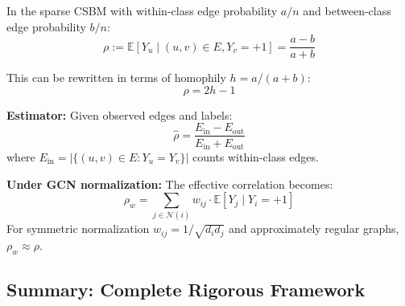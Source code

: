 \begin{definition}
\label{def:rho_explicit}
In the sparse CSBM with within-class edge probability $a/n$ and between-class edge probability $b/n$:
\begin{equation}
    \rho := \mathbb{E}[Y_u \mid (u,v) \in E, Y_v = +1] = \frac{a - b}{a + b}
\end{equation}

This can be rewritten in terms of homophily $h = a/(a+b)$:
\begin{equation}
    \rho = 2h - 1
\end{equation}

\textbf{Estimator:} Given observed edges and labels:
\begin{equation}
    \hat{\rho} = \frac{E_{\mathrm{in}} - E_{\mathrm{out}}}{E_{\mathrm{in}} + E_{\mathrm{out}}}
\end{equation}
where $E_{\mathrm{in}} = |\{(u,v) \in E : Y_u = Y_v\}|$ counts within-class edges.

\textbf{Under GCN normalization:} The effective correlation becomes:
\begin{equation}
    \rho_w = \sum_{j \in \mathcal{N}(i)} w_{ij} \cdot \mathbb{E}[Y_j \mid Y_i = +1]
\end{equation}
For symmetric normalization $w_{ij} = 1/\sqrt{d_i d_j}$ and approximately regular graphs, $\rho_w \approx \rho$.
\end{definition}

\subsection{Summary: Complete Rigorous Framework}
\label{subsec:complete_summary_rigorous}

